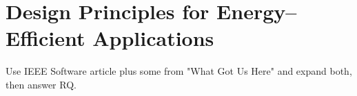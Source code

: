 \chapter{Design Principles for Energy--Efficient Applications}

Use IEEE Software article plus some from "What Got Us Here" and expand both, then answer RQ.